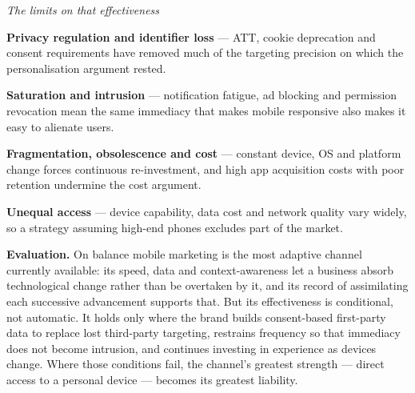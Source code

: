 \begin{qlist}
\textit{The limits on that effectiveness}
\begin{apts}\setcounter{enumi}{7}
\item \textbf{Privacy regulation and identifier loss} --- ATT, cookie
      deprecation and consent requirements have removed much of the targeting
      precision on which the personalisation argument rested.
\item \textbf{Saturation and intrusion} --- notification fatigue, ad blocking
      and permission revocation mean the same immediacy that makes mobile
      responsive also makes it easy to alienate users.
\item \textbf{Fragmentation, obsolescence and cost} --- constant device, OS and
      platform change forces continuous re-investment, and high app acquisition
      costs with poor retention undermine the cost argument.
\item \textbf{Unequal access} --- device capability, data cost and network
      quality vary widely, so a strategy assuming high-end phones excludes part
      of the market.
\end{apts}

\textbf{Evaluation.} On balance mobile marketing is the most adaptive channel
currently available: its speed, data and context-awareness let a business
absorb technological change rather than be overtaken by it, and its record of
assimilating each successive advancement supports that. But its effectiveness
is conditional, not automatic. It holds only where the brand builds
consent-based first-party data to replace lost third-party targeting, restrains
frequency so that immediacy does not become intrusion, and continues investing
in experience as devices change. Where those conditions fail, the channel's
greatest strength --- direct access to a personal device --- becomes its
greatest liability.


\end{qlist}
